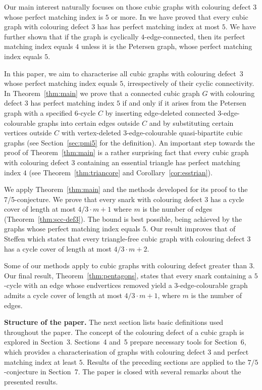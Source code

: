 \documentclass[a4paper]{amsart}
\theoremstyle{plain}
\theoremstyle{definition}
\begin{document}
Our main interest naturally focuses on those cubic graphs with
colouring defect $3$ whose perfect matching index is $5$ or
more. In \cite{KMNS-Berge} we have proved that every cubic
graph with colouring defect $3$ has has perfect matching index
at most $5$.  We have further shown that if the graph is
cyclically $4$-edge-connected, then its perfect matching index
equals $4$ unless it is the Petersen graph, whose perfect
matching index equals $5$.

In this paper, we aim to characterise all cubic graphs with
colouring defect~$3$ whose perfect matching index equals $5$,
irrespectively of their cyclic connectivity. In
Theorem~\ref{thm:main} we prove that a connected cubic graph
$G$ with colouring defect $3$ has perfect matching index $5$ if
and only if it arises from the Petersen graph with a specified
$6$-cycle $C$ by inserting edge-deleted connected
$3$-edge-colourable graphs into certain edges outside $C$ and
by substituting certain vertices outside $C$ with
vertex-deleted $3$-edge-colourable quasi-bipartite cubic graphs
(see Section~\ref{sec:pmi5} for the definition). An important
step towards the proof of Theorem~\ref{thm:main} is a rather
surprising fact that every cubic graph with colouring defect
$3$ containing an essential triangle has perfect matching index
$4$ (see Theorem~\ref{thm:triancore} and
Corollary~\ref{cor:esstrian}).

We apply Theorem~\ref{thm:main} and the methods developed for
its proof to the 7/5-conjecture. We prove that every snark with
colouring defect $3$ has a cycle cover of length at most
$4/3\cdot m+1$ where $m$ is the number of edges
(Theorem~\ref{thm:scc-def3}). The bound is best possible, being
achieved by the graphs whose perfect matching index equals $5$.
Our result improves that of Steffen \cite[Corollary~2.20]{S2}
which states that every triangle-free cubic graph with
colouring defect $3$ has a cycle cover of length at most
$4/3\cdot m+2$.

Some of our methods apply to cubic graphs with colouring defect
greater than $3$. Our final result,
Theorem~\ref{thm:pentagons}, states that every snark containing
a $5$-cycle with an edge whose endvertices removed yield a
$3$-edge-colourable graph admits a cycle cover of length at
most $4/3\cdot m+1$, where $m$ is the number of edges.


\textbf{Structure of the paper.} The next section lists basic
definitions used throughout the paper. The concept of the
colouring defect of a cubic graph is explored in Section~3.
Sections~4 and~5 prepare necessary tools for Section~6, which
provides a characterisation of graphs with colouring defect $3$
and perfect matching index at least $5$. Results of the
preceding sections are applied to the $7/5$-conjecture in
Section~7. The paper is closed with several remarks about the
presented results.
\end{document}
